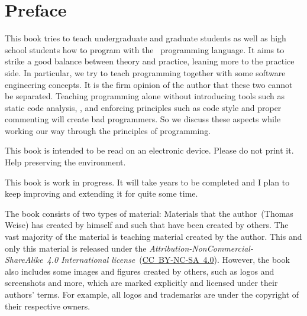 \chapter*{Preface}%
%
%
This book tries to teach undergraduate and graduate students as well as high school students how to program with the \python\ programming language.
It aims to strike a good balance between theory and practice, leaning more to the practice side.
In particular, we try to teach programming together with some software engineering concepts.
It is the firm opinion of the author that these two cannot be separated.
Teaching programming alone without introducing tools such as static code analysis, , and enforcing principles such as code style and proper commenting will create bad programmers.
So we discuss these aspects while working our way through the principles of programming.

This book is intended to be read on an electronic device.
Please do not print it.
Help preserving the environment.

This book is work in progress.
It will take years to be completed and I plan to keep improving and extending it for quite some time.

The book consists of two types of material:
Materials that the author~(Thomas Weise) has created by himself and such that have been created by others.
The vast majority of the material is teaching material created by the author.
This and only this material is released under the \emph{Attribution-NonCommercial-ShareAlike~4.0 International license}~(\href{http://creativecommons.org/licenses/by-nc-sa/4.0}{\mbox{CC~BY-NC-SA~4.0}}).
However, the book also includes some images and figures created by others, such as logos and screenshots and more, which are marked explicitly and licensed under their authors' terms.
For example, all logos and trademarks are under the copyright of their respective owners.

